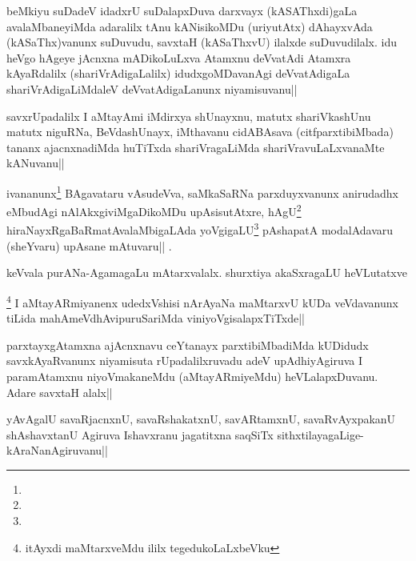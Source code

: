 \begin{artha}
beMkiyu suDadeV idadxrU suDalapxDuva darxvayx (kASAThxdi)gaLa avalaMbaneyiMda adaralilx tAnu kANisikoMDu (uriyutAtx) dAhayxvAda (kASaThx)vanunx suDuvudu, savxtaH (kASaThxvU) ilalxde suDuvudilalx. idu heVgo hAgeye jAcnxna mADikoLuLxva Atamxnu deVvatAdi Atamxra kAyaRdalilx (shariVrAdigaLalilx) idudxgoMDavanAgi deVvatAdigaLa shariVrAdigaLiMdaleV deVvatAdigaLanunx niyamisuvanu||
\end{artha}


\begin{artha}
savxrUpadalilx I aMtayAmi iMdirxya shUnayxnu, matutx shariVkashUnu matutx niguRNa, BeVdashUnayx, iMthavanu cidABAsava  (citfparxtibiMbada) tananx ajacnxnadiMda huTiTxda shariVragaLiMda shariVravuLaLxvanaMte kANuvanu||
\end{artha}


\begin{artha}%
ivananunx\footnote[1]{\stext} BAgavataru vAsudeVva, saMkaSaRNa parxduyxvanunx anirudadhx eMbudAgi nAlAkxgiviMgaDikoMDu upAsisutAtxre, hAgU\footnote[2]{\stext} hiraNayxRgaBaRmatAvalaMbigaLAda yoVgigaLU\footnote[3]{\stext} pAshapatA modalAdavaru (sheYvaru) upAsane mAtuvaru|| \stext.
\end{artha}

\begin{artha}
keVvala purANa-AgamagaLu mAtarxvalalx. shurxtiya akaSxragaLU heVLutatxve
\end{artha}

\begin{artha}
\footnote[4]{\stext itAyxdi maMtarxveMdu ililx tegedukoLaLxbeVku} I aMtayARmiyanenx udedxVshisi nArAyaNa maMtarxvU kUDa veVdavanunx tiLida mahAmeVdhAvipuruSariMda viniyoVgisalapxTiTxde||	
\end{artha}

\begin{artha}%
parxtayxgAtamxna ajAcnxnavu ceYtanayx parxtibiMbadiMda kUDidudx savxkAyaRvanunx niyamisuta rUpadalilxruvadu adeV upAdhiyAgiruva I paramAtamxnu niyoVmakaneMdu (aMtayARmiyeMdu) heVLalapxDuvanu. Adare savxtaH alalx||
\end{artha}

\begin{artha}
yAvAgalU savaRjacnxnU, savaRshakatxnU, savARtamxnU, savaRvAyxpakanU shAshavxtanU Agiruva Ishavxranu jagatitxna saqSiTx sithxtilayagaLige-kAraNanAgiruvanu||
\end{artha}

